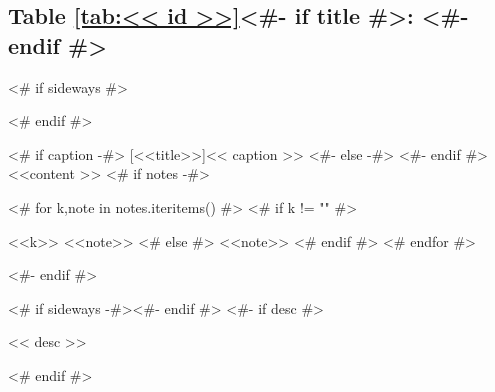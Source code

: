 \subsection{Table \ref{tab:<< id >>}<#- if title #>: <#- endif #>\hfill%
  \color{light-gray}}

<# if sideways #>
\begin{adjustbox}{angle=90}
<# endif #>
\begin{threeparttable}
  <# if caption -#>
  [<<title>>]{<< caption >>}
  <#- else -#>
  <#- endif #>\label{tab:<< id >>}
  <<content >>
  <# if notes -#>
  \begin{tablenotes}
    <# for k,note in notes.iteritems() #>
    <# if k != "" #>
    \item [<<k>>] <<note>>
    <# else #>
    <<note>>
    <# endif #>
    <# endfor #>
  \end{tablenotes}
  <#- endif #>
\end{threeparttable}
<# if sideways -#>\end{adjustbox}<#- endif #>
<#- if desc #>
\nopagebreak
\begin{figinfo}<< desc >>\end{figinfo}
<# endif #>
\vspace{20pt}


